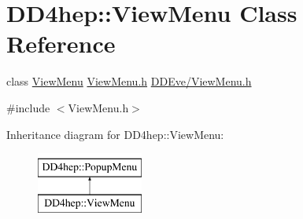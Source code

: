 \hypertarget{class_d_d4hep_1_1_view_menu}{}\section{D\+D4hep\+:\+:View\+Menu Class Reference}
\label{class_d_d4hep_1_1_view_menu}


class \hyperlink{class_d_d4hep_1_1_view_menu}{View\+Menu} \hyperlink{_view_menu_8h}{View\+Menu.\+h} \hyperlink{_view_menu_8h}{D\+D\+Eve/\+View\+Menu.\+h}  




{\ttfamily \#include $<$View\+Menu.\+h$>$}

Inheritance diagram for D\+D4hep\+:\+:View\+Menu\+:\begin{figure}[H]
\begin{center}
\leavevmode
\includegraphics[height=2.000000cm]{class_d_d4hep_1_1_view_menu}
\end{center}
\end{figure}
